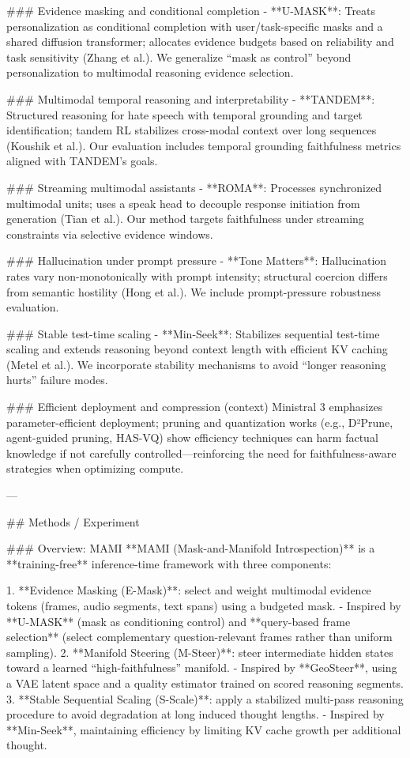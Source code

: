 ### Evidence masking and conditional completion  
- **U-MASK**: Treats personalization as conditional completion with user/task-specific masks and a shared diffusion transformer; allocates evidence budgets based on reliability and task sensitivity (Zhang et al.). We generalize “mask as control” beyond personalization to multimodal reasoning evidence selection.

### Multimodal temporal reasoning and interpretability  
- **TANDEM**: Structured reasoning for hate speech with temporal grounding and target identification; tandem RL stabilizes cross-modal context over long sequences (Koushik et al.). Our evaluation includes temporal grounding faithfulness metrics aligned with TANDEM’s goals.

### Streaming multimodal assistants  
- **ROMA**: Processes synchronized multimodal units; uses a speak head to decouple response initiation from generation (Tian et al.). Our method targets faithfulness under streaming constraints via selective evidence windows.

### Hallucination under prompt pressure  
- **Tone Matters**: Hallucination rates vary non-monotonically with prompt intensity; structural coercion differs from semantic hostility (Hong et al.). We include prompt-pressure robustness evaluation.

### Stable test-time scaling  
- **Min-Seek**: Stabilizes sequential test-time scaling and extends reasoning beyond context length with efficient KV caching (Metel et al.). We incorporate stability mechanisms to avoid “longer reasoning hurts” failure modes.

### Efficient deployment and compression (context)  
Ministral 3 emphasizes parameter-efficient deployment; pruning and quantization works (e.g., D²Prune, agent-guided pruning, HAS-VQ) show efficiency techniques can harm factual knowledge if not carefully controlled—reinforcing the need for faithfulness-aware strategies when optimizing compute.

---

## Methods / Experiment  

### Overview: MAMI  
**MAMI (Mask-and-Manifold Introspection)** is a **training-free** inference-time framework with three components:

1. **Evidence Masking (E-Mask)**: select and weight multimodal evidence tokens (frames, audio segments, text spans) using a budgeted mask.  
   - Inspired by **U-MASK** (mask as conditioning control) and **query-based frame selection** (select complementary question-relevant frames rather than uniform sampling).
2. **Manifold Steering (M-Steer)**: steer intermediate hidden states toward a learned “high-faithfulness” manifold.  
   - Inspired by **GeoSteer**, using a VAE latent space and a quality estimator trained on scored reasoning segments.
3. **Stable Sequential Scaling (S-Scale)**: apply a stabilized multi-pass reasoning procedure to avoid degradation at long induced thought lengths.  
   - Inspired by **Min-Seek**, maintaining efficiency by limiting KV cache growth per additional thought.

